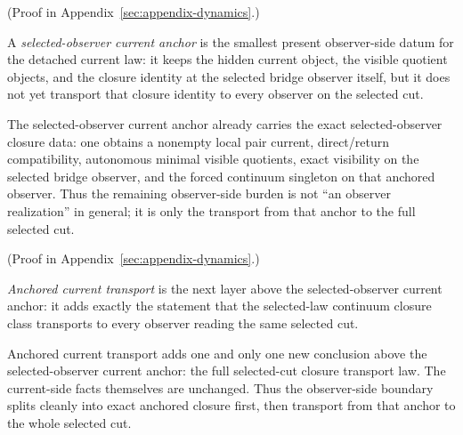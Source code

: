 (Proof in Appendix~\ref{sec:appendix-dynamics}.)

\begin{definition}
\label{def:selected-observer-current-anchor}
A \emph{selected-observer current anchor} is the smallest present observer-side
datum for the detached current law: it keeps the hidden current object, the
visible quotient objects, and the closure identity at the selected bridge
observer itself, but it does not yet transport that closure identity to every
observer on the selected cut.
\end{definition}

\begin{theorem}
\label{thm:selected-observer-current-anchor-forces-exact-anchored-closure}
The selected-observer current anchor already carries the exact selected-observer
closure data: one obtains a nonempty local pair current, direct/return
compatibility, autonomous minimal visible quotients, exact visibility on the
selected bridge observer, and the forced continuum singleton on that anchored
observer. Thus the remaining observer-side burden is not “an observer
realization” in general; it is only the transport from that anchor to the full
selected cut.
\end{theorem}

(Proof in Appendix~\ref{sec:appendix-dynamics}.)

\begin{definition}
\label{def:anchored-current-transport}
\emph{Anchored current transport} is the next layer above the selected-observer
current anchor: it adds exactly the statement that the selected-law continuum
closure class transports to every observer reading the same selected cut.
\end{definition}

\begin{theorem}
\label{thm:anchored-current-transport-extends-exact-anchored-closure-to-the-full-selected-cut}
Anchored current transport adds one and only one new conclusion above the
selected-observer current anchor: the full selected-cut closure transport law.
The current-side facts themselves are unchanged. Thus the observer-side
boundary
splits cleanly into exact anchored closure first, then transport from that
anchor to the whole selected cut.
\end{theorem}

